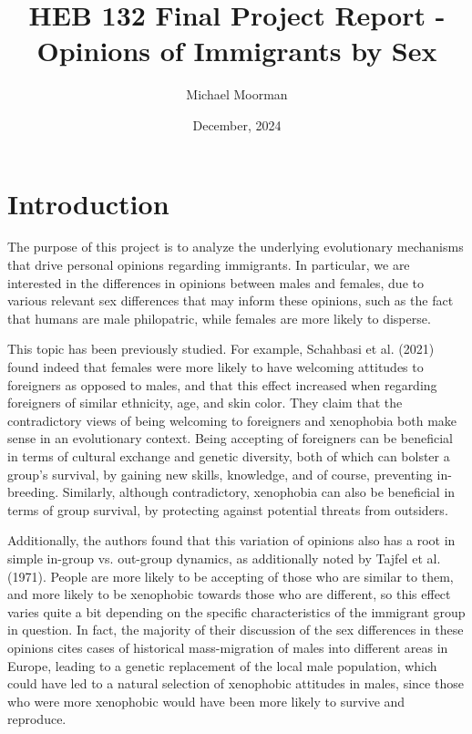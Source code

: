 \documentclass{article}
\title{HEB 132 Final Project Report - Opinions of Immigrants by Sex}
\author{Michael Moorman}
\date{December, 2024}
\begin{document}
\fontsize{11.8}{12}\selectfont

\maketitle

\section{Introduction}

The purpose of this project is to analyze the underlying evolutionary mechanisms that drive personal opinions regarding immigrants. In particular, we are interested in the differences in opinions between males and females, due to various relevant sex differences that may inform these opinions, such as the fact that humans are male philopatric\cite{malePhilopatry}, while females are more likely to disperse\cite{femaleDispersal}. 

This topic has been previously studied. For example, Schahbasi et al. (2021) found indeed that females were more likely to have welcoming attitudes to foreigners as opposed to males, and that this effect increased when regarding foreigners of similar ethnicity, age, and skin color\cite{immigrantOpinions}. They claim that the contradictory views of being welcoming to foreigners and xenophobia both make sense in an evolutionary context. Being accepting of foreigners can be beneficial in terms of cultural exchange and genetic diversity, both of which can bolster a group's survival, by gaining new skills, knowledge, and of course, preventing in-breeding. Similarly, although contradictory, xenophobia can also be beneficial in terms of group survival, by protecting against potential threats from outsiders.

Additionally, the authors found that this variation of opinions also has a root in simple in-group vs. out-group dynamics, as additionally noted by Tajfel et al. (1971)\cite{ingroup}. People are more likely to be accepting of those who are similar to them, and more likely to be xenophobic towards those who are different, so this effect varies quite a bit depending on the specific characteristics of the immigrant group in question. In fact, the majority of their discussion of the sex differences in these opinions cites cases of historical mass-migration of males into different areas in Europe, leading to a genetic replacement of the local male population, which could have led to a natural selection of xenophobic attitudes
in males, since those who were more xenophobic would have been more likely to survive and reproduce.
\end{document}
